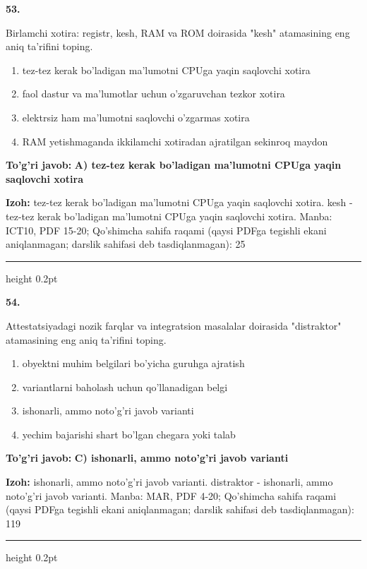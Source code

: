 \documentclass[10pt,a4paper]{article}
\begin{document}
{\bfseries\sffamily\color{ink} 53.}
\par
Birlamchi xotira: registr, kesh, RAM va ROM doirasida "kesh" atamasining eng aniq ta'rifini toping.
\begin{enumerate}[label=\Alph*),leftmargin=9mm]
\item tez-tez kerak bo'ladigan ma'lumotni CPUga yaqin saqlovchi xotira
\item faol dastur va ma'lumotlar uchun o'zgaruvchan tezkor xotira
\item elektrsiz ham ma'lumotni saqlovchi o'zgarmas xotira
\item RAM yetishmaganda ikkilamchi xotiradan ajratilgan sekinroq maydon
\end{enumerate}
\begin{tcolorbox}[enhanced,breakable,colback=teal!4,colframe=teal!60!black,boxrule=0.45pt,arc=1.2mm,left=2.7mm,right=2.7mm,top=1.8mm,bottom=1.8mm,before skip=2mm,after skip=2mm]
{\bfseries\sffamily\color{teal}To'g'ri javob:} \textbf{A) tez-tez kerak bo'ladigan ma'lumotni CPUga yaqin saqlovchi xotira}
\par\smallskip
{\bfseries Izoh:} tez-tez kerak bo'ladigan ma'lumotni CPUga yaqin saqlovchi xotira. kesh - tez-tez kerak bo'ladigan ma'lumotni CPUga yaqin saqlovchi xotira. Manba: ICT10, PDF 15-20; Qo'shimcha sahifa raqami (qaysi PDFga tegishli ekani aniqlanmagan; darslik sahifasi deb tasdiqlanmagan): 25
\end{tcolorbox}
\vspace{2mm}\hrule height 0.2pt\vspace{3mm}

{\bfseries\sffamily\color{ink} 54.}
\par
Attestatsiyadagi nozik farqlar va integratsion masalalar doirasida "distraktor" atamasining eng aniq ta'rifini toping.
\begin{enumerate}[label=\Alph*),leftmargin=9mm]
\item obyektni muhim belgilari bo'yicha guruhga ajratish
\item variantlarni baholash uchun qo'llanadigan belgi
\item ishonarli, ammo noto'g'ri javob varianti
\item yechim bajarishi shart bo'lgan chegara yoki talab
\end{enumerate}
\begin{tcolorbox}[enhanced,breakable,colback=teal!4,colframe=teal!60!black,boxrule=0.45pt,arc=1.2mm,left=2.7mm,right=2.7mm,top=1.8mm,bottom=1.8mm,before skip=2mm,after skip=2mm]
{\bfseries\sffamily\color{teal}To'g'ri javob:} \textbf{C) ishonarli, ammo noto'g'ri javob varianti}
\par\smallskip
{\bfseries Izoh:} ishonarli, ammo noto'g'ri javob varianti. distraktor - ishonarli, ammo noto'g'ri javob varianti. Manba: MAR, PDF 4-20; Qo'shimcha sahifa raqami (qaysi PDFga tegishli ekani aniqlanmagan; darslik sahifasi deb tasdiqlanmagan): 119
\end{tcolorbox}
\vspace{2mm}\hrule height 0.2pt\vspace{3mm}
\end{document}
